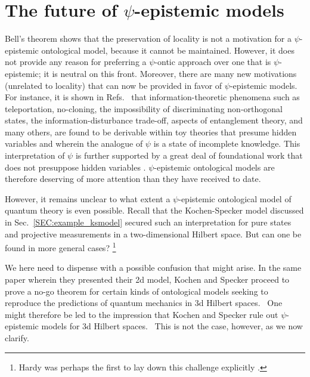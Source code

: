 \documentclass[aps,nofootinbib,12pt]{revtex4}
\begin{document}
\section{The future of $\psi$-epistemic models
\label{SEC:discussion}}

Bell's theorem shows that the preservation of locality is not a
motivation for a $\psi$-epistemic ontological model, because it
cannot be maintained. However, it does not provide any reason for
preferring a $\psi$-ontic approach over one that is
$\psi$-epistemic; it is neutral on this front. Moreover, there are
many new motivations (unrelated to locality) that can now be
provided in favor of $\psi$-epistemic models. For instance, it is
shown in Refs.~\cite{toy_theory,BRSLiouville} that
information-theoretic phenomena such as teleportation, no-cloning,
the impossibility of discriminating non-orthogonal states, the
information-disturbance trade-off, aspects of entanglement theory,
and many others, are found to be derivable within toy theories that
presume hidden variables and wherein the analogue of $\psi$ is a
state of incomplete knowledge. This interpretation of $\psi$ is
further supported by a great deal of foundational work that does not
presuppose hidden variables
\cite{Emerson,Fuchs,FuchsJmodopt,Ballentine70,Ballentine94,Peierls,Leiferarxiv,Leiferpra,CFS02,CFS02arxiv,CFS06}.
$\psi$-epistemic ontological models are therefore deserving of more
attention than they have received to date.

However, it remains unclear to what extent a $\psi$-epistemic
ontological model of quantum theory is even possible. Recall that
the Kochen-Specker model discussed in Sec.~\ref{SEC:example_ksmodel}
secured such an interpretation for pure states and projective
measurements in a two-dimensional Hilbert space. But can one be
found in more general cases? \footnote{Hardy was perhaps the first
to lay down this challenge explicitly \cite{Hardyprivate}.}

We here need to dispense with a possible confusion that might arise.
In the same paper wherein they presented their 2d model, Kochen and
Specker proceed to prove a no-go theorem for certain kinds of
ontological models seeking to reproduce the predictions of quantum
mechanics in 3d Hilbert spaces. \ One might therefore be led to the
impression that Kochen and Specker rule out $\psi$-epistemic models
for 3d Hilbert spaces. \ This is not the case, however, as we now
clarify.
\end{document}
